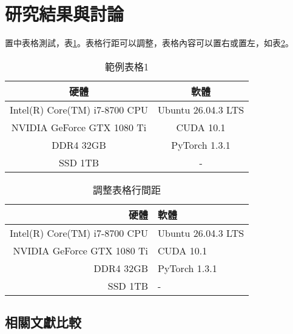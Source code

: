 
\section{研究結果與討論}

置中表格測試，表\ref{table:hardware_software}。表格行距可以調整，表格內容可以置右或置左，如表\ref{table:hardware_software_2}。

\begin{table}[!htb]
    \centering
    \caption{範例表格1}
    \label{table:hardware_software}
    \begin{tabular}{cc}
        \toprule
        \textbf{硬體} & \textbf{軟體} \\
        \midrule
        Intel(R) Core(TM) i7-8700 CPU & Ubuntu 26.04.3 LTS \\
        NVIDIA GeForce GTX 1080 Ti    & CUDA 10.1          \\
        DDR4 32GB                     & PyTorch 1.3.1      \\
        SSD 1TB                       & -                  \\
        \bottomrule
    \end{tabular}
\end{table}

\renewcommand{\arraystretch}{2} %
\begin{table}[!htb]
    \centering
    \caption{調整表格行間距}
    \label{table:hardware_software_2}
    \begin{tabular}{rl}
        \toprule
        \textbf{硬體} & \textbf{軟體} \\
        \midrule
        Intel(R) Core(TM) i7-8700 CPU & Ubuntu 26.04.3 LTS \\
        NVIDIA GeForce GTX 1080 Ti    & CUDA 10.1          \\
        DDR4 32GB                     & PyTorch 1.3.1      \\
        SSD 1TB                       & -                  \\
        \bottomrule
    \end{tabular}
\end{table}

\subsection{相關文獻比較}

